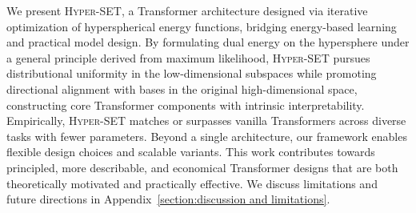 We present \textsc{Hyper-SET}, a Transformer architecture designed via iterative optimization of hyperspherical energy functions, bridging energy-based learning and practical model design. By formulating dual energy on the hypersphere under a general principle derived from maximum likelihood, \textsc{Hyper-SET} pursues distributional uniformity in the low-dimensional subspaces while promoting directional alignment with bases in the original high-dimensional space, constructing core Transformer components with intrinsic interpretability. Empirically, \textsc{Hyper-SET} matches or surpasses vanilla Transformers across diverse tasks with fewer parameters. Beyond a single architecture, our framework enables flexible design choices and scalable variants. This work contributes towards principled, more describable, and economical Transformer designs that are both theoretically motivated and practically effective. We discuss limitations and future directions in Appendix~\ref{section:discussion and limitations}.